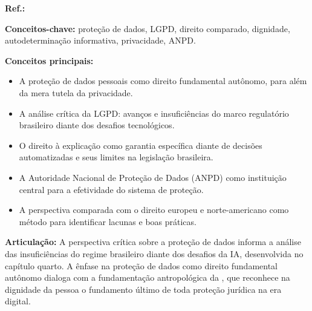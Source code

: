 \begin{fichamento}
    \textbf{Ref.:} \cite{MendesDoneda2021PD}
    
    \textbf{Conceitos-chave:} proteção de dados, LGPD, direito comparado, dignidade, autodeterminação informativa, privacidade, ANPD.
    
    \textbf{Conceitos principais:}
    \begin{itemize}
        \item A proteção de dados pessoais como direito fundamental autônomo, para além da mera tutela da privacidade.
        \item A análise crítica da LGPD: avanços e insuficiências do marco regulatório brasileiro diante dos desafios tecnológicos.
        \item O direito à explicação como garantia específica diante de decisões automatizadas e seus limites na legislação brasileira.
        \item A Autoridade Nacional de Proteção de Dados (ANPD) como instituição central para a efetividade do sistema de proteção.
        \item A perspectiva comparada com o direito europeu e norte-americano como método para identificar lacunas e boas práticas.
    \end{itemize}
    
    \textbf{Articulação:} A perspectiva crítica sobre a proteção de dados informa a análise das insuficiências do regime brasileiro diante dos desafios da IA, desenvolvida no capítulo quarto. A ênfase na proteção de dados como direito fundamental autônomo dialoga com a fundamentação antropológica da \MH{}, que reconhece na dignidade da pessoa o fundamento último de toda proteção jurídica na era digital.
\end{fichamento}

